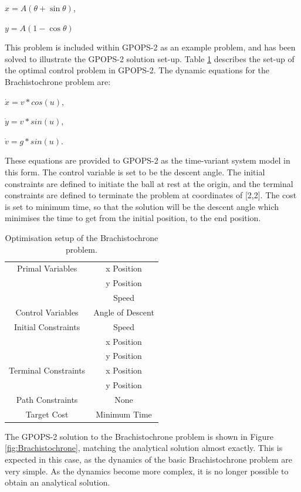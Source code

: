 $x = A(\theta + \sin\theta) $,

$y=A(1 - \cos\theta)$

This problem is included within GPOPS-2 as an example problem, and has been solved to illustrate the GPOPS-2 solution set-up\cite{Rao2010}. Table \ref{tab:brachistochrone} describes the set-up of the optimal control problem in GPOPS-2. The dynamic equations for the Brachistochrone problem are:

$\dot{x} = v*cos(u)$,

$\dot{y} = v*sin(u)$,

$\dot{v} = g*sin(u)$.

\noindent These equations are provided to GPOPS-2 as the time-variant system model in this form. The control variable is set to be the descent angle. The initial constraints are defined to initiate the ball at rest at the origin, and the terminal constraints are defined to terminate the problem at coordinates of [2,2]. The cost is set to minimum time, so that the solution will be the descent angle which minimises the time to get from the initial position, to the end position. 

\begin{table}
	\centering
	\begin{tabular}{|c|c|}
		\hline Primal Variables  & x Position\\& y Position\\& Speed\\ 
		\hline Control Variables  & Angle of Descent\\ 
		\hline Initial Constraints  & Speed\\ & x Position\\ & y Position\\
		\hline Terminal Constraints &  x Position\\ & y Position\\
		\hline Path Constraints & None \\ 
		\hline Target Cost & Minimum Time \\ 
		\hline 
	\end{tabular} 
	\caption{Optimisation setup of the Brachistochrone problem. }
	\label{tab:brachistochrone}
\end{table}


The GPOPS-2 solution to the Brachistochrone problem is shown in Figure \ref{fig:Brachistochrone}, matching the analytical solution almost exactly. This is expected in this case, as the dynamics of the basic Brachistochrone problem are very simple. As the dynamics become more complex, it is no longer possible to obtain an analytical solution.  

